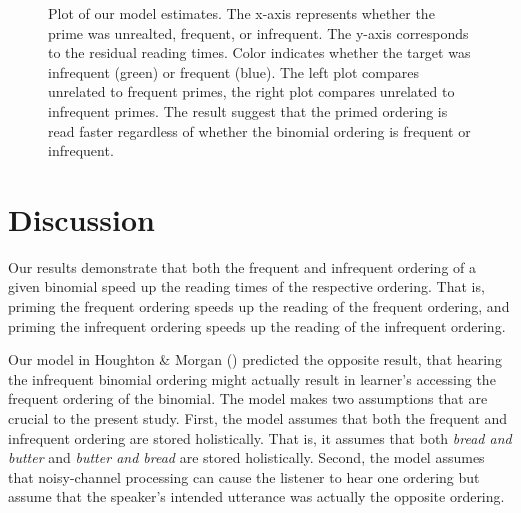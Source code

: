 \documentclass[
  12pt,
]{scrartcl}
\begin{document}
\begin{figure}[htbp]

\caption{\label{fig-fullresults}Plot of our model estimates. The x-axis
represents whether the prime was unrealted, frequent, or infrequent. The
y-axis corresponds to the residual reading times. Color indicates
whether the target was infrequent (green) or frequent (blue). The left
plot compares unrelated to frequent primes, the right plot compares
unrelated to infrequent primes. The result suggest that the primed
ordering is read faster regardless of whether the binomial ordering is
frequent or infrequent.}


\end{figure}%

\section{Discussion}\label{discussion}

Our results demonstrate that both the frequent and infrequent ordering
of a given binomial speed up the reading times of the respective
ordering. That is, priming the frequent ordering speeds up the reading
of the frequent ordering, and priming the infrequent ordering speeds up
the reading of the infrequent ordering.

Our model in Houghton \& Morgan
()
predicted the opposite result, that hearing the infrequent binomial
ordering might actually result in learner's accessing the frequent
ordering of the binomial. The model makes two assumptions that are
crucial to the present study. First, the model assumes that both the
frequent and infrequent ordering are stored holistically. That is, it
assumes that both \emph{bread and butter} and \emph{butter and bread}
are stored holistically. Second, the model assumes that noisy-channel
processing can cause the listener to hear one ordering but assume that
the speaker's intended utterance was actually the opposite ordering.
\end{document}
